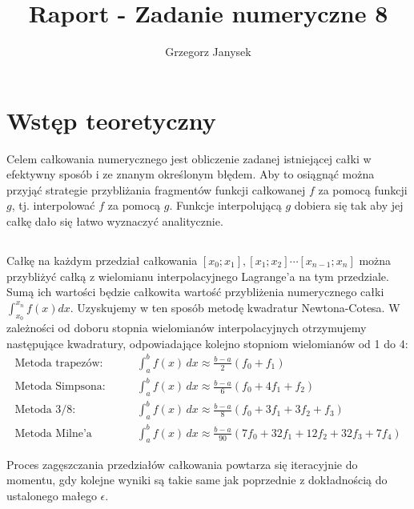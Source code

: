 \documentclass[11pt]{extarticle}
\author{Grzegorz Janysek}
\title{Raport - Zadanie numeryczne 8}
\begin{document}
	\maketitle

	\section{Wstęp teoretyczny}
	Celem całkowania numerycznego jest obliczenie zadanej istniejącej całki w efektywny sposób i ze znanym określonym błędem.
	Aby to osiągnąć można przyjąć strategie przybliżania fragmentów funkcji całkowanej \(f\) za pomocą funkcji \(g\), tj. interpolować \(f\) za pomocą \(g\).
	Funkcje interpolującą \(g\) dobiera się tak aby jej całkę dało się łatwo wyznaczyć analitycznie.

	\subsection{}
	Całkę na każdym przedział całkowania \([x_0; x_1], [x_1; x_2] \dotsm [x_{n-1}; x_n]\) można przybliżyć całką z wielomianu interpolacyjnego Lagrange'a na tym przedziale.
	Sumą ich wartości będzie całkowita wartość przybliżenia numerycznego całki \( \int_{x_0}^{x_n} f(x) dx\).
	Uzyskujemy w ten sposób metodę kwadratur Newtona-Cotesa.
	W zależności od doboru stopnia wielomianów interpolacyjnych otrzymujemy następujące kwadratury, odpowiadające kolejno stopniom wielomianów od 1 do 4:
	\begin{align}
		\text{Metoda trapezów:} \qquad &
		\int_a^b f(x)\,dx \approx \frac{b-a}{2}(f_0 + f_1) \\
		\text{Metoda Simpsona:} \qquad &
		\int_a^b f(x)\,dx \approx \frac{b-a}{6}(f_0 + 4f_1 + f_2) \\
		\text{Metoda 3/8:} \qquad &
		\int_a^b f(x)\,dx \approx \frac{b-a}{8}(f_0 + 3f_1 + 3f_2 + f_3) \\
		\text{Metoda Milne'a} \qquad &
		\int_a^b f(x)\,dx \approx \frac{b-a}{90}(7f_0 + 32f_1 + 12f_2 + 32f_3 + 7f_4)
	\end{align}

	Proces zagęszczania przedziałów całkowania powtarza się iteracyjnie do momentu, gdy kolejne wyniki są takie same jak poprzednie z dokładnością do ustalonego małego \(\epsilon\).
\end{document}
